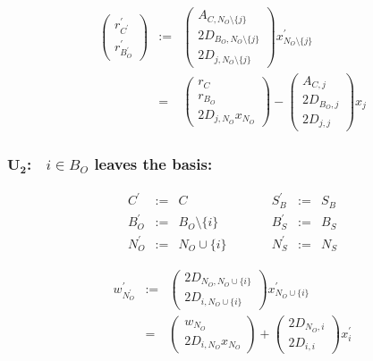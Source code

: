 \documentclass[a4paper]{article}
\begin{document}
\begin{eqnarray}
\left(
\begin{array}{c}
r_{C^{\prime}}^{\prime} \\
\hline
r_{B_{O}^{\prime}}^{\prime}
\end{array}
\right)
&:=&
\left(
\begin{array}{c}
A_{C, N_{O} \setminus \{j\}} \\
\hline
2D_{B_{O}, N_{O} \setminus \{j\}} \\
\hline
2D_{j, N_{O} \setminus \{j\}} 
\end{array}
\right)
x_{N_{O} \setminus \{j\}}^{\prime} 
\nonumber \\
&=&
\left(
\begin{array}{c}
r_{C} \\
\hline
r_{B_{O}} \\
\hline
2D_{j, N_{O}}x_{N_{O}}
\end{array}
\right)
-
\left(
\begin{array}{c}
A_{C, j} \\
\hline
2D_{B_{O}, j} \\
\hline
2D_{j, j}
\end{array}
\right)
x_{j}
\end{eqnarray}

\subsubsection{$\mathbf{U_{2}}$:$\quad i \in B_{O}$ leaves the basis:}
\begin{equation}
\label{update:original_leaves_basis}
\begin{array}{ccccccc}
C^{\prime}      &:=&  C
&\quad\quad&
S_{B}^{\prime}  &:=&  S_{B}   \\
B_{O}^{\prime}  &:=&  B_{O} \setminus \{i\}
&\quad\quad&
B_{S}^{\prime}  &:=&  B_{S}   \\
N_{O}^{\prime}  &:=&  N_{O} \cup \{i\}
&\quad\quad&
N_{S}^{\prime}  &:=&  N_{S} 
\end{array}
\end{equation}

\begin{eqnarray}
w_{N_{O}^{\prime}}^{\prime}
&:=&
\left(
\begin{array}{c}
2D_{N_{O}, N_{O} \cup \{i\}} \\
\hline
2D_{i, N_{O} \cup \{i\}}
\end{array}
\right)
x_{N_{O} \cup \{i\}}^{\prime}
\nonumber \\
&=&
\left(
\begin{array}{c}
w_{N_{O}} \\
\hline
2D_{i, N_{O}}x_{N_{O}}
\end{array}
\right)
+
\left(
\begin{array}{c}
2D_{N_{O}, i} \\
\hline
2D_{i, i}
\end{array}
\right)
x_{i}^{\prime}
\end{eqnarray}
\end{document}

